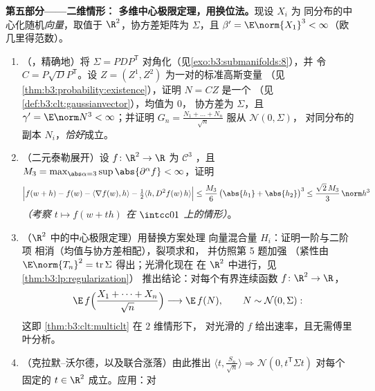 \begin{problem}
\medskip
\noindent\textbf{第五部分——二维情形：
多维中心极限定理，用换位法。}现设 $X_i$ 为
同分布的中心化随机\emph{向量}，取值于 $\R^2$，协方差矩阵为
$\Sigma$，且 $\beta' = \E\norm{X_1}^3 <
\infty$（欧几里得范数）。
\begin{enumerate}[resume]
  \item （，精确地）将 $\Sigma =
        PDP^{\mathsf T}$ 对角化（见\cref{exo:b3:submanifolds:8}），并
        令 $C = P\sqrt DP^{\mathsf T}$。设 $Z = (Z^1,
        Z^2)$ 为一对的标准高斯变量
        （见\cref{thm:b3:probability:existence}），证明 $N
        = CZ$ 是一个
        （见\cref{def:b3:clt:gaussianvector}），均值为 $0$，
        协方差为 $\Sigma$，且 $\gamma' = \E\norm N^3 <
        \infty$；并证明 $G_n = \frac{N_1 + \dots +
        N_n}{\sqrt n}$ 服从 $\mathcal N(0, \Sigma)$，
        对同分布的副本 $N_i$，\emph{恰好}成立。
  \item （二元泰勒展开）设 $f \colon \R^2 \to
        \R$ 为 $\mathcal C^3$ ，且 $M_3 =
        \max_{\abs\alpha = 3}\sup\abs{\partial^\alpha f} <
        \infty$，证明
        \[
        \Bigl|f(w + h) - f(w) - \langle\nabla f(w),
        h\rangle - \tfrac12\langle h, D^2f(w)\,h\rangle
        \Bigr| \leq \frac{M_3}6\,\bigl(\abs{h_1} +
        \abs{h_2}\bigr)^3 \leq \frac{\sqrt2\,M_3}3\,
        \norm h^3
        \]
        \emph{（考察 $t \mapsto f(w + th)$ 在
        $\intcc01$ 上的情形）}。
  \item （$\R^2$ 中的中心极限定理）用替换方案处理
        向量混合量 $H_i$：证明一阶与二阶项
        相消（均值与协方差相配），裂项求和，
        并仿照第 5 题加强
        （紧性由 $\E\norm{T_n}^2 =
        \operatorname{tr}\Sigma$ 得出；光滑化现在
        在 $\R^2$ 中进行，见\cref{thm:b3:lp:regularization}）
        推出结论：对每个有界连续函数 $f \colon
        \R^2 \to \R$，
        \[
        \E\,f\Bigl(\frac{X_1 + \dots + X_n}{\sqrt n}\Bigr)
        \longrightarrow \E\,f(N), \qquad N \sim \mathcal
        N(0, \Sigma) :
        \]
        这即 \cref{thm:b3:clt:multiclt} 在 $2$ 维情形下，
        对光滑的 $f$ 给出速率，且无需傅里叶分析。
  \item （克拉默--沃尔德，以及联合涨落）由此推出
        $\langle t, \frac{S_n}{\sqrt n}\rangle
        \Rightarrow \mathcal N(0, t^{\mathsf T}\Sigma t)$
        对每个固定的 $t \in \R^2$ 成立。应用：对

\end{enumerate}
\end{problem}
